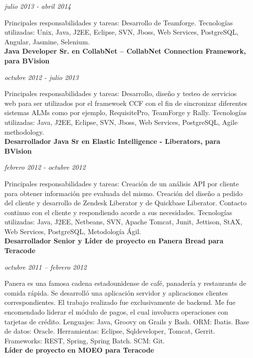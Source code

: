\documentclass[a4paper,11pt]{article}
\begin{document}
\noindent \emph{julio 2013 - abril 2014}

\noindent Principales responsabilidades y tareas: Desarrollo de Teamforge.
Tecnologías utilizadas: Unix, Java, J2EE, Eclipse, SVN, Jboss, Web Services,
PostgreSQL, Angular, Jasmine, Selenium. \\

\noindent \textbf{Java Developer Sr. en CollabNet – CollabNet Connection
Framework, para BVision}

\noindent \emph{octubre 2012 - julio 2013}

\noindent Principales responsabilidades y tareas: Desarrollo, diseño y testeo
de servicios web para ser utilizados por el framewoek CCF con el fin de
sincronizar diferentes sistemas ALMs como por ejemplo, RequisitePro, TeamForge
y Rally.
Tecnologías utilizadas: Java, J2EE, Eclipse, SVN, Jboss, Web Services,
PostgreSQL, Agile methodology. \\

\noindent \textbf{Desarrollador Java Sr en Elastic Intelligence - Liberators,
para BVision}

\noindent \emph{febrero 2012 - octubre 2012}

\noindent Principales responsabilidades y tareas: Creación de un análisis API
por cliente para obtener información pre evaluada del mismo. Creación del
diseño a pedido del cliente y desarrollo de Zendesk Liberator y de Quickbase
Liberator. Contacto continuo con el cliente y respondiendo acorde a sus
necesidades.  Tecnologías utilizadas: Java, J2EE, Netbeans, SVN, Apache Tomcat,
Junit, Jettison, StAX, Web Services, PostgreSQL, Metodología Ágil. \\

\noindent \textbf{Desarrollador Senior y Líder de proyecto en Panera Bread para
Teracode}

\noindent \emph{octubre 2011 – febrero 2012}

\noindent Panera es una famosa cadena estadounidense de café, panadería y
restaurants de comida rápida.  Se desarrolló una aplicación servidor y
aplicaciones clientes correspondientes.
El trabajo realizado fue exclusivamente de backend. Me fue encomendado liderar
el módulo de pagos, el cual involucra operaciones con tarjetas de crédito.
Lenguajes: Java, Groovy on Grails y Bash.
ORM: Ibatis.
Base de datos: Oracle.
Herramientas: Eclipse, Sqldeveloper, Tomcat, Gerrit.
Frameworks: REST, Spring, Spring Batch.
SCM: Git. \\

\noindent \textbf{Líder de proyecto en MOEO para Teracode}
\end{document}
